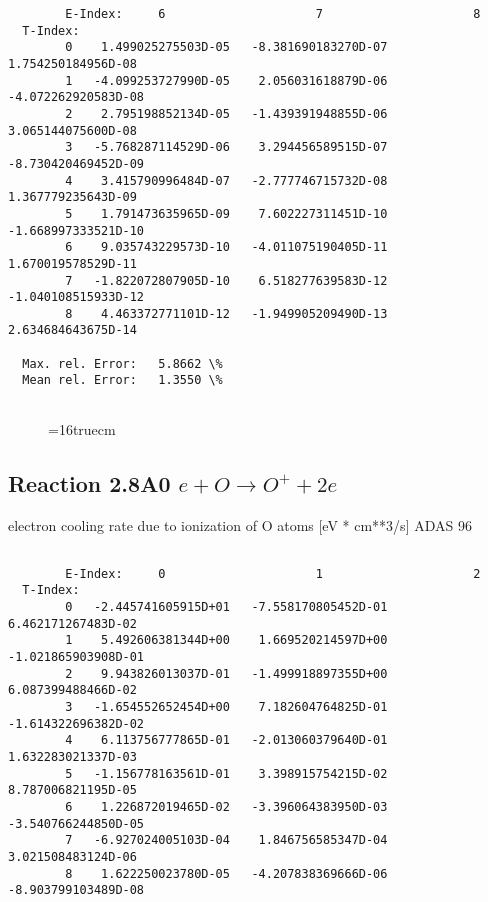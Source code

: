 \documentclass[12pt,dvipdfmx]{article}
\begin{document}
{\begin{small}
\begin{verbatim}
        E-Index:     6                     7                     8
  T-Index:
        0    1.499025275503D-05   -8.381690183270D-07    1.754250184956D-08
        1   -4.099253727990D-05    2.056031618879D-06   -4.072262920583D-08
        2    2.795198852134D-05   -1.439391948855D-06    3.065144075600D-08
        3   -5.768287114529D-06    3.294456589515D-07   -8.730420469452D-09
        4    3.415790996484D-07   -2.777746715732D-08    1.367779235643D-09
        5    1.791473635965D-09    7.602227311451D-10   -1.668997333521D-10
        6    9.035743229573D-10   -4.011075190405D-11    1.670019578529D-11
        7   -1.822072807905D-10    6.518277639583D-12   -1.040108515933D-12
        8    4.463372771101D-12   -1.949905209490D-13    2.634684643675D-14

  Max. rel. Error:   5.8662 \%
  Mean rel. Error:   1.3550 \%


\end{verbatim}\end{small}
\begin{figure} \label{2.7il}
\epsfxsize=16truecm 
\end{figure}
\newpage

\subsection{
  Reaction 2.8A0  $e + O  \rightarrow O^+   + 2e $
}
electron cooling rate due to ionization of O atoms [eV * cm**3/s]
ADAS 96

\begin{small}\begin{verbatim}

        E-Index:     0                     1                     2
  T-Index:
        0   -2.445741605915D+01   -7.558170805452D-01    6.462171267483D-02
        1    5.492606381344D+00    1.669520214597D+00   -1.021865903908D-01
        2    9.943826013037D-01   -1.499918897355D+00    6.087399488466D-02
        3   -1.654552652454D+00    7.182604764825D-01   -1.614322696382D-02
        4    6.113756777865D-01   -2.013060379640D-01    1.632283021337D-03
        5   -1.156778163561D-01    3.398915754215D-02    8.787006821195D-05
        6    1.226872019465D-02   -3.396064383950D-03   -3.540766244850D-05
        7   -6.927024005103D-04    1.846756585347D-04    3.021508483124D-06
        8    1.622250023780D-05   -4.207838369666D-06   -8.903799103489D-08


\end{verbatim}
\end{small}}
\end{document}
